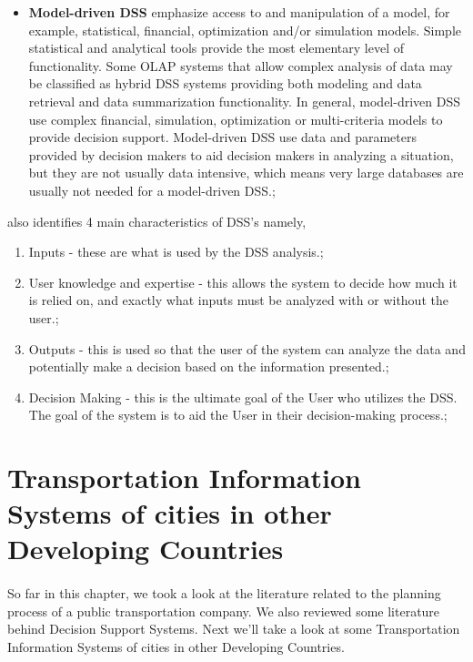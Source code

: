 \begin {itemize}
\item \textbf{Model-driven DSS} emphasize access to and manipulation of a model, for example, statistical, financial, optimization and/or simulation models. Simple statistical and analytical tools provide the most elementary level of functionality. Some OLAP systems that allow complex analysis of data may be classified as hybrid DSS systems providing both modeling and data retrieval and data summarization functionality. In general, model-driven DSS use complex financial, simulation, optimization or multi-criteria models to provide decision support. Model-driven DSS use data and parameters provided by decision makers to aid decision makers in analyzing a situation, but they are not usually data intensive, which means very large databases are usually not needed for a model-driven DSS.;
\end {itemize}

\cite{Power2003} also identifies 4 main characteristics of DSS's namely,

\begin {enumerate}
\item Inputs - these are what is used by the DSS analysis.;
\item User knowledge and expertise - this allows the system to decide how much it is relied on, and exactly what inputs must be analyzed with or without the user.;
\item Outputs - this is used so that the user of the system can analyze the data and potentially make a decision based on the information presented.;
\item Decision Making - this is the ultimate goal of the User who utilizes the DSS. The goal of the system is to aid the User in their decision-making process.;
\end {enumerate}

\section{Transportation Information Systems of cities in other Developing Countries}

\paragraph{} So far in this chapter, we took a look at the literature related to the planning process of a public transportation company. We also reviewed some literature behind Decision Support Systems. Next we'll take a look at some Transportation Information Systems of cities in other Developing Countries.

